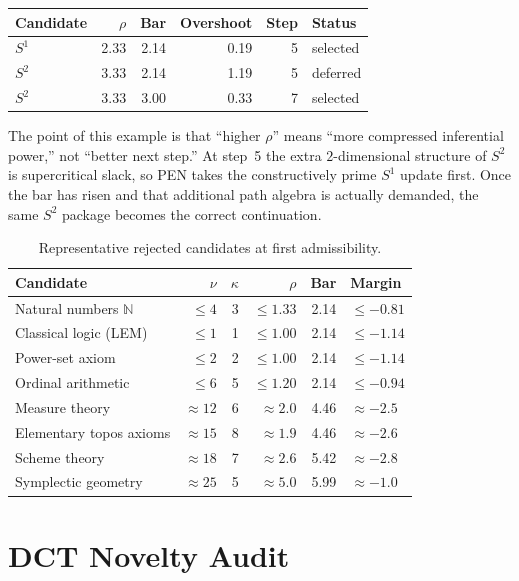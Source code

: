 \documentclass[11pt,a4paper]{article}
\theoremstyle{plain}
\theoremstyle{definition}
\theoremstyle{remark}
\newcommand{\N}{\mathbb{N}}
\begin{document}
\begin{center}
\small
\begin{tabular}{@{}lrrrrl@{}}
\toprule
Candidate & $\rho$ & Bar & Overshoot & Step & Status \\
\midrule
$S^1$ & 2.33 & 2.14 & 0.19 & 5 & selected \\
$S^2$ & 3.33 & 2.14 & 1.19 & 5 & deferred \\
$S^2$ & 3.33 & 3.00 & 0.33 & 7 & selected \\
\bottomrule
\end{tabular}
\end{center}

The point of this example is that ``higher $\rho$'' means ``more compressed inferential power,'' not ``better next step.''  At step~5 the extra $2$-dimensional structure of $S^2$ is supercritical slack, so PEN takes the constructively prime $S^1$ update first.  Once the bar has risen and that additional path algebra is actually demanded, the same $S^2$ package becomes the correct continuation.

\begin{table}[tbp]
\centering
\caption{Representative rejected candidates at first admissibility.}
\label{tab:rejected}
\small
\begin{tabular}{@{}lrrrrl@{}}
\toprule
Candidate & $\nu$ & $\kappa$ & $\rho$ & Bar & Margin \\
\midrule
Natural numbers $\N$ & $\le 4$ & 3 & $\le 1.33$ & 2.14 & $\le -0.81$ \\
Classical logic (LEM) & $\le 1$ & 1 & $\le 1.00$ & 2.14 & $\le -1.14$ \\
Power-set axiom & $\le 2$ & 2 & $\le 1.00$ & 2.14 & $\le -1.14$ \\
Ordinal arithmetic & $\le 6$ & 5 & $\le 1.20$ & 2.14 & $\le -0.94$ \\
Measure theory & $\approx 12$ & 6 & $\approx 2.0$ & 4.46 & $\approx -2.5$ \\
Elementary topos axioms & $\approx 15$ & 8 & $\approx 1.9$ & 4.46 & $\approx -2.6$ \\
Scheme theory & $\approx 18$ & 7 & $\approx 2.6$ & 5.42 & $\approx -2.8$ \\
Symplectic geometry & $\approx 25$ & 5 & $\approx 5.0$ & 5.99 & $\approx -1.0$ \\
\bottomrule
\end{tabular}
\end{table}

\section{DCT Novelty Audit}
\label{app:dct-audit}
\end{document}
